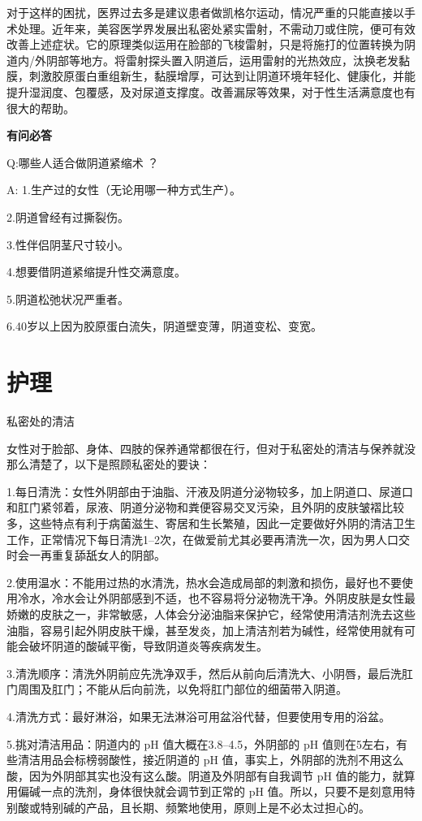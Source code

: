 \documentclass[12pt,UTF8]{ctexbook}
\begin{document}
对于这样的困扰，医界过去多是建议患者做凯格尔运动，情况严重的只能直接以手术处理。近年来，美容医学界发展出私密处紧实雷射，不需动刀或住院，便可有效改善上述症状。它的原理类似运用在脸部的飞梭雷射，只是将施打的位置转换为阴道内/外阴部等地方。将雷射探头置入阴道后，运用雷射的光热效应，汰换老发黏膜，刺激胶原蛋白重组新生，黏膜增厚，可达到让阴道环境年轻化、健康化，并能提升湿润度、包覆感，及对尿道支撑度。改善漏尿等效果，对于性生活满意度也有很大的帮助。

\textbf{有问必答}

Q:哪些人适合做阴道紧缩术 ？

A:
1.生产过的女性（无论用哪一种方式生产）。

2.阴道曾经有过撕裂伤。

3.性伴侣阴茎尺寸较小。

4.想要借阴道紧缩提升性交满意度。

5.阴道松弛状况严重者。

6.40岁以上因为胶原蛋白流失，阴道壁变薄，阴道变松、变宽。

\section{护理}

私密处的清洁

女性对于脸部、身体、四肢的保养通常都很在行，但对于私密处的清洁与保养就没那么清楚了，以下是照顾私密处的要诀：

1.每日清洗：女性外阴部由于油脂、汗液及阴道分泌物较多，加上阴道口、尿道口和肛门紧邻着，尿液、阴道分泌物和粪便容易交叉污染，且外阴的皮肤皱褶比较多，这些特点有利于病菌滋生、寄居和生长繁殖，因此一定要做好外阴的清洁卫生工作，正常情况下每日清洗1--2次，在做爱前尤其必要再清洗一次，因为男人口交时会一再重复舔舐女人的阴部。

2.使用温水：不能用过热的水清洗，热水会造成局部的刺激和损伤，最好也不要使用冷水，冷水会让外阴部感到不适，也不容易将分泌物洗干净。外阴皮肤是女性最娇嫩的皮肤之一，非常敏感，人体会分泌油脂来保护它，经常使用清洁剂洗去这些油脂，容易引起外阴皮肤干燥，甚至发炎，加上清洁剂若为碱性，经常使用就有可能会破坏阴道的酸碱平衡，导致阴道炎等疾病发生。

3.清洗顺序：清洗外阴前应先洗净双手，然后从前向后清洗大、小阴唇，最后洗肛门周围及肛门；不能从后向前洗，以免将肛门部位的细菌带入阴道。

4.清洗方式：最好淋浴，如果无法淋浴可用盆浴代替，但要使用专用的浴盆。

5.挑对清洁用品：阴道内的 pH 值大概在3.8--4.5，外阴部的 pH 值则在5左右，有些清洁用品会标榜弱酸性，接近阴道的 pH 值，事实上，外阴部的洗剂不用这么酸，因为外阴部其实也没有这么酸。阴道及外阴部有自我调节 pH 值的能力，就算用偏碱一点的洗剂，身体很快就会调节到正常的 pH 值。所以，只要不是刻意用特别酸或特别碱的产品，且长期、频繁地使用，原则上是不必太过担心的。
\end{document}
